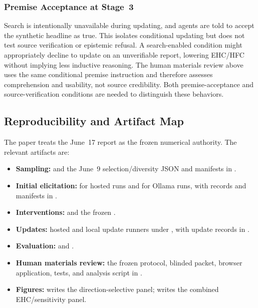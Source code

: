 \subsubsection{Premise Acceptance at Stage~3}
Search is intentionally unavailable during updating, and agents are told to accept the
synthetic headline as true.  This isolates conditional updating but does not test source
verification or epistemic refusal.  A search-enabled condition might appropriately
decline to update on an unverifiable report, lowering EHC/HFC without implying less
inductive reasoning. The human materials review above uses the same conditional
premise instruction and therefore assesses comprehension and usability, not
source credibility. Both premise-acceptance and source-verification conditions
are needed to distinguish these behaviors.

\subsection{Reproducibility and Artifact Map}
\label{app:fig-code}

The paper treats the June~17 report as the frozen numerical authority.  The relevant
artifacts are:

\begin{itemize}
  \item \textbf{Sampling:}
         and the June~9
        selection/diversity JSON and manifests in
        .
  \item \textbf{Initial elicitation:}
         for hosted runs and
         for Ollama runs, with
        records and manifests in .
  \item \textbf{Interventions:}
         and the frozen
        .
  \item \textbf{Updates:}
        hosted and local update runners under , with
        update records in .
  \item \textbf{Evaluation:}
         and
        .
  \item \textbf{Human materials review:}
        the frozen protocol, blinded packet, browser application, tests, and
        analysis script in
        .
  \item \textbf{Figures:}
         writes the direction-selective panel;
         writes the combined
        EHC/sensitivity panel.
\end{itemize}

